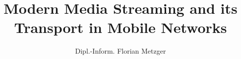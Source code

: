 
\title{Modern Media Streaming and its Transport in Mobile Networks}
\author{Dipl.-Inform. Florian Metzger}